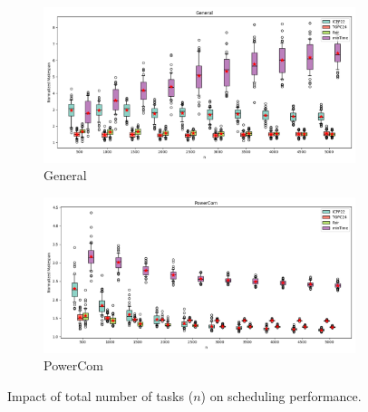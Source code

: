 \documentclass{article}
\begin{document}
\begin{figure}[htbp]
\\[2ex]
\begin{subfigure}[b]{0.32\textwidth}\includegraphics[width=\textwidth]{Results/n/n_General_boxplot}\caption{General}\label{fig:boxplot_figures_n_General}\end{subfigure}
\hfill
\begin{subfigure}[b]{0.32\textwidth}\includegraphics[width=\textwidth]{Results/n/n_PowerCom_boxplot}\caption{PowerCom}\label{fig:boxplot_figures_n_PowerCom}\end{subfigure}
\hfill
\caption{Impact of total number of tasks ($n$) on scheduling performance.}
\label{fig:boxplot_figures_n}
\end{figure}
\end{document}
